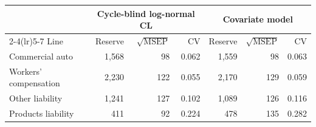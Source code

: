 \begin{tabular}{lrrrrrr}
\toprule
& \multicolumn{3}{c}{Cycle-blind log-normal CL} & \multicolumn{3}{c}{Covariate model} \\
\cmidrule(lr){2-4}\cmidrule(lr){5-7}
Line & Reserve & $\sqrt{\mathrm{MSEP}}$ & CV & Reserve & $\sqrt{\mathrm{MSEP}}$ & CV \\
\midrule
Commercial auto & 1,568 & 98 & 0.062 & 1,559 & 98 & 0.063 \\
Workers' compensation & 2,230 & 122 & 0.055 & 2,170 & 129 & 0.059 \\
Other liability & 1,241 & 127 & 0.102 & 1,089 & 126 & 0.116 \\
Products liability & 411 & 92 & 0.224 & 478 & 135 & 0.282 \\
\bottomrule
\end{tabular}
